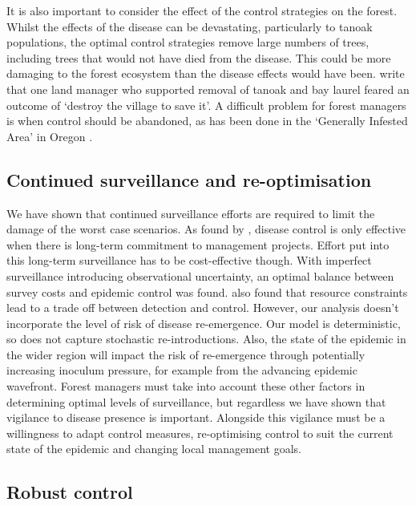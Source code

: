 It is also important to consider the effect of the control strategies on the forest. Whilst the effects of the disease can be devastating, particularly to tanoak populations, the optimal control strategies remove large numbers of trees, including trees that would not have died from the disease. This could be more damaging to the forest ecosystem than the disease effects would have been. \citet{alexander_lessons_2010} write that one land manager who supported removal of tanoak and bay laurel feared an outcome of `destroy the village to save it'. A difficult problem for forest managers is when control should be abandoned, as has been done in the `Generally Infested Area' in Oregon \citep{hansen_efficacy_2019}.

\subsection{Continued surveillance and re-optimisation}

We have shown that continued surveillance efforts are required to limit the damage of the worst case scenarios. As found by \citet{cobb_resiliency_2017}, disease control is only effective when there is long-term commitment to management projects. Effort put into this long-term surveillance has to be cost-effective though. With imperfect surveillance introducing observational uncertainty, an optimal balance between survey costs and epidemic control was found. \citet{ndeffo_mbah_balancing_2010} also found that resource constraints lead to a trade off between detection and control. However, our analysis doesn't incorporate the level of risk of disease re-emergence. Our model is deterministic, so does not capture stochastic re-introductions. Also, the state of the epidemic in the wider region will impact the risk of re-emergence through potentially increasing inoculum pressure, for example from the advancing epidemic wavefront. Forest managers must take into account these other factors in determining optimal levels of surveillance, but regardless we have shown that vigilance to disease presence is important. Alongside this vigilance must be a willingness to adapt control measures, re-optimising control to suit the current state of the epidemic and changing local management goals.

\subsection{Robust control}


